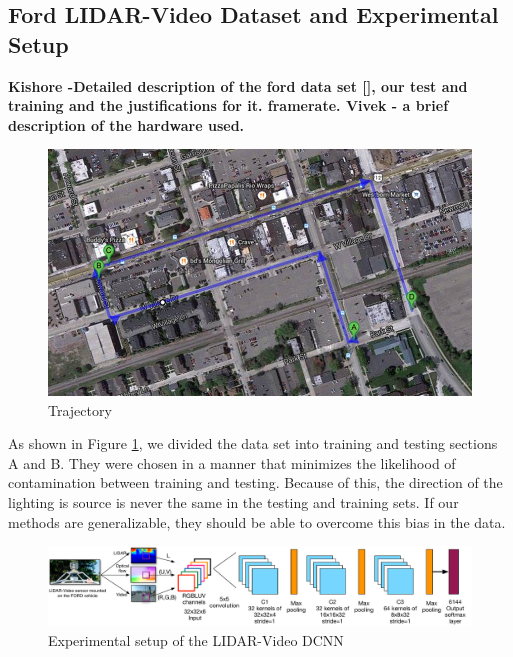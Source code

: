 \documentclass{article}
\begin{document}
\subsection{Ford LIDAR-Video Dataset and Experimental Setup} %
\label{sub:ford_lidar_video_dataset_and_experimental_setup}

\textbf{ Kishore -Detailed description of the ford data set [], our test and training and the justifications for it. framerate. 
Vivek - a brief description of the hardware used. }

\begin{figure}[htbp]
    \centering
        \includegraphics[scale=0.45]{Figures/image003.jpg}
    \caption{Trajectory }
    \label{fig:dataset_partition}
\end{figure}

As shown in Figure \ref{fig:dataset_partition}, we divided the data set into training and testing sections A and B. They were chosen in a manner that minimizes the likelihood of contamination between training and testing. Because of this, the direction of the lighting is source is never the same in the testing and training sets. If our methods are generalizable, they should be able to overcome this bias in the data.  

\begin{figure}[htbp]
    \centering
        \includegraphics[scale=0.35]{Figures/lidar_dcnn_setup1.pdf}
    \caption{Experimental setup of the LIDAR-Video DCNN}
    \label{fig:Figures_lidar_dcnn_setup1}
\end{figure}
\end{document}
